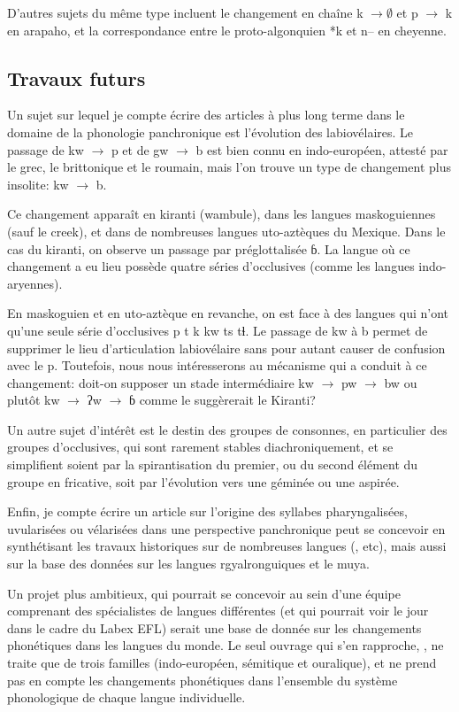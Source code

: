 \documentclass[oldfontcommands,oneside,a4paper,11pt]{memoir}
\begin{document}
D'autres sujets du même type incluent le changement en chaîne k $\rightarrow \emptyset$ et p $\rightarrow $ k en arapaho, et la correspondance entre le proto-algonquien *k et n-- en cheyenne.

\subsection{Travaux futurs}
Un sujet sur lequel je compte écrire des articles à plus long terme dans le domaine de la phonologie panchronique est l'évolution des labiovélaires. Le passage de kw $\rightarrow $ p et de gw $\rightarrow $ b est bien connu en indo-européen, attesté par le grec, le brittonique et le roumain, mais l'on trouve un type de changement plus insolite: kw $\rightarrow $ b.

Ce changement apparaît en kiranti (wambule), dans les langues maskoguiennes (sauf le creek), et dans de nombreuses langues uto-aztèques du Mexique. Dans le cas du kiranti, on observe un passage par préglottalisée ɓ. La langue où ce changement a eu lieu possède quatre séries d'occlusives (comme les langues indo-aryennes).

En maskoguien et en uto-aztèque en revanche, on est face à des langues qui n'ont qu'une seule série d'occlusives p t k kw ts tɬ. Le passage de kw à b permet de supprimer le lieu d'articulation labiovélaire sans pour autant causer de confusion avec le p. Toutefois, nous nous intéresserons au mécanisme qui a conduit à ce changement: doit-on supposer un stade intermédiaire kw $\rightarrow $ pw $\rightarrow $ bw ou plutôt kw $\rightarrow $ ʔw $\rightarrow $ ɓ comme le suggèrerait le Kiranti?

Un autre sujet d'intérêt est le destin des groupes de consonnes, en particulier des groupes d'occlusives, qui sont rarement stables diachroniquement, et se simplifient soient par la spirantisation du premier, ou du second élément du groupe en fricative, soit par l'évolution vers une géminée ou une aspirée.

Enfin, je compte écrire un article sur l'origine des syllabes pharyngalisées, uvularisées ou vélarisées  dans une perspective panchronique peut se concevoir en synthétisant les travaux historiques sur de nombreuses langues (\citealt{authier08budugh}, \citealt{sagart-baxter09} etc), mais aussi sur la base des données sur les langues rgyalronguiques et le muya.

Un projet plus ambitieux, qui pourrait se concevoir au sein d'une équipe comprenant des spécialistes de langues différentes (et qui pourrait voir le jour dans le cadre du Labex EFL) serait une base de donnée sur les 
changements phonétiques dans les langues du monde. Le seul ouvrage qui s'en rapproche, \citet{kuemmel07wandel}, ne traite que de trois familles (indo-européen, sémitique et ouralique), et ne prend pas en compte les changements phonétiques dans l'ensemble du système phonologique de chaque langue individuelle.
\end{document}
